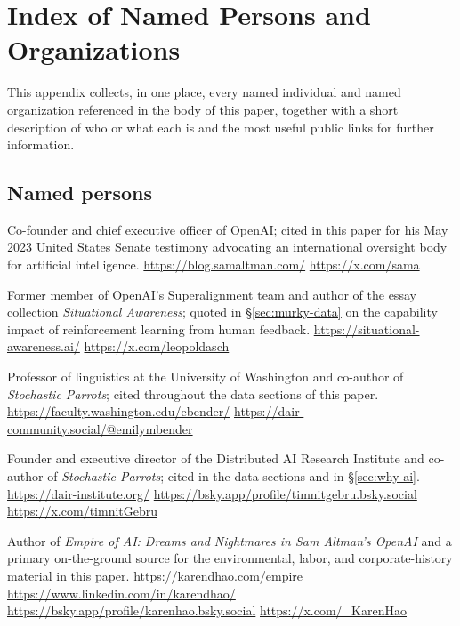 \documentclass[10pt,a4paper,twocolumn]{article}
\begin{document}
\section{Index of Named Persons and Organizations}
\label{sec:appendix-index}

This appendix collects, in one place, every named individual and named organization referenced in the body of this paper, together with a short description of who or what each is and the most useful public links for further information.

\subsection*{Named persons}

\begin{description}\setlength{\itemsep}{2pt plus 0.5pt}

\item[Sam Altman.] Co-founder and chief executive officer of OpenAI; cited in this paper for his May 2023 United States Senate testimony advocating an international oversight body for artificial intelligence. \url{https://blog.samaltman.com/} \quad \url{https://x.com/sama}

\item[Leopold Aschenbrenner.] Former member of OpenAI's Superalignment team and author of the essay collection \emph{Situational Awareness}; quoted in \S\ref{sec:murky-data} on the capability impact of reinforcement learning from human feedback. \url{https://situational-awareness.ai/} \quad \url{https://x.com/leopoldasch}

\item[Emily M. Bender.] Professor of linguistics at the University of Washington and co-author of \emph{Stochastic Parrots}; cited throughout the data sections of this paper. \url{https://faculty.washington.edu/ebender/} \quad \url{https://dair-community.social/@emilymbender}

\item[Timnit Gebru.] Founder and executive director of the Distributed AI Research Institute and co-author of \emph{Stochastic Parrots}; cited in the data sections and in \S\ref{sec:why-ai}. \url{https://dair-institute.org/} \quad \url{https://bsky.app/profile/timnitgebru.bsky.social} \quad \url{https://x.com/timnitGebru}

\item[Karen Hao.] Author of \emph{Empire of AI: Dreams and Nightmares in Sam Altman's OpenAI} and a primary on-the-ground source for the environmental, labor, and corporate-history material in this paper. \url{https://karendhao.com/empire} \quad \url{https://www.linkedin.com/in/karendhao/} \quad \url{https://bsky.app/profile/karenhao.bsky.social} \quad \url{https://x.com/_KarenHao}


\end{description}
\end{document}

